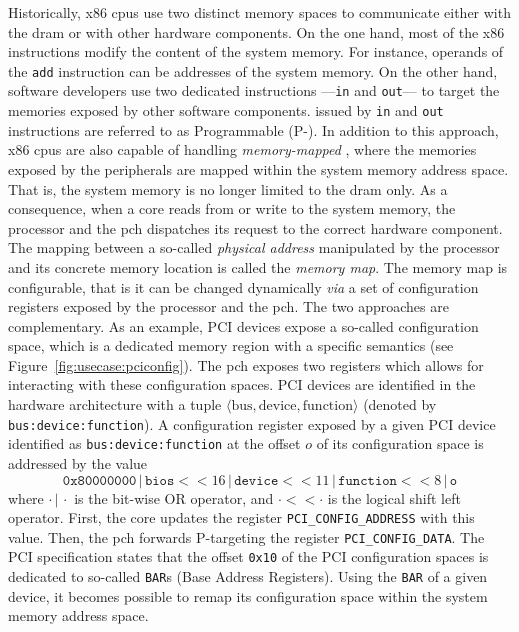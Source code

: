 Historically, x86 \acp{cpu} use two distinct memory spaces to communicate either
with the \ac{dram} or with other hardware components.
%
On the one hand, most of the x86 instructions modify the content of the system
memory.
%
For instance, operands of the \texttt{add} instruction can be addresses of the
system memory.
%
On the other hand, software developers use two dedicated instructions
---\texttt{in} and \texttt{out}--- to target the memories exposed by other
software components.
%
\IOs issued by \texttt{in} and \texttt{out} instructions are referred to as
Programmable \IOs (P-\IOs).
%
In addition to this approach, x86 \acp{cpu} are also capable of handling
\emph{memory-mapped} \IOs, where the memories exposed by the peripherals are
mapped within the system memory address space.
%
That is, the system memory is no longer limited to the
\ac{dram} only.
%
As a consequence, when a core reads from or write to the system memory, the
processor and the \ac{pch} dispatches its request to the correct hardware
component.
%
The mapping between a so-called \emph{physical address} manipulated by the
processor and its concrete memory location is called the \emph{memory map}.
%
The memory map is configurable, that is it can be changed dynamically \emph{via}
a set of configuration registers exposed by the processor and the \ac{pch}.
%
The two approaches are complementary.
%
As an example, PCI devices expose a so-called configuration space, which is a
dedicated memory region with a specific semantics (see
Figure~\ref{fig:usecase:pciconfig}).
%
The \ac{pch} exposes two registers which allows for interacting with these
configuration spaces.
%
PCI devices are identified in the hardware architecture with a tuple
\( \langle \mathrm{bus}, \mathrm{device}, \mathrm{function} \rangle \) (denoted
by \texttt{bus:device:function}).
%
A configuration register exposed by a given PCI device identified as
\texttt{bus:device:function} at the offset \( o \) of its configuration space is
addressed by the value
%
\[
  \mathtt{0x80000000}\,|\,\texttt{bios} <\!\!< 16\,|\,\texttt{device} <\!\!<
  11\,|\,\texttt{function} <\!\!< 8\,|\,\texttt{o}
\]
%
where \(\cdot\,|\,\cdot\) is the bit-wise OR operator, and
\(\cdot <\!\!< \cdot\) is the logical shift left operator.
%
First, the core updates the register \texttt{PCI\_CONFIG\_ADDRESS} with this
value.
%
Then, the \ac{pch} forwards P-\IOs targeting the register
\texttt{PCI\_CONFIG\_DATA}.
%
The PCI specification states that the offset \texttt{0x10} of the PCI
configuration spaces is dedicated to so-called \texttt{BAR}s (Base Address
Registers).
%
Using the \texttt{BAR} of a given device, it becomes possible to remap its
configuration space within the system memory address space.

